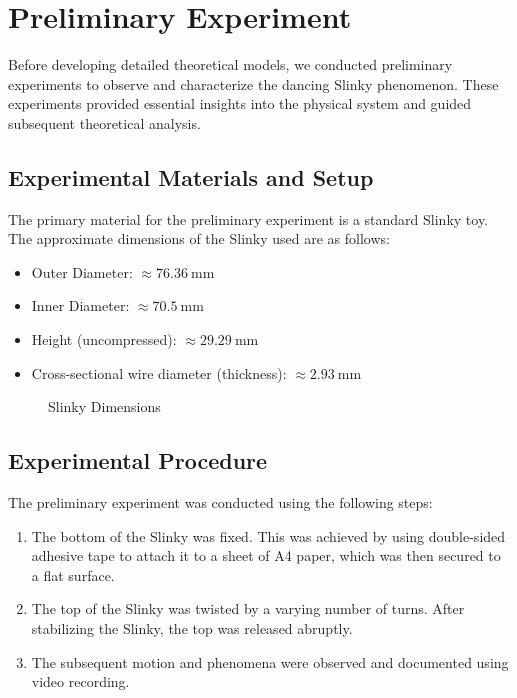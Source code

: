 \documentclass{mcmthesis}  %
\begin{document}
\section{Preliminary Experiment} %

Before developing detailed theoretical models, we conducted preliminary experiments to observe and characterize the dancing Slinky phenomenon. These experiments provided essential insights into the physical system and guided subsequent theoretical analysis.

\subsection{Experimental Materials and Setup} %
The primary material for the preliminary experiment is a standard Slinky toy. The approximate dimensions of the Slinky used are as follows:
\begin{itemize}
    \item Outer Diameter: \(\approx \SI{76.36}{\milli\meter}\)
    \item Inner Diameter: \(\approx \SI{70.5}{\milli\meter}\)
    \item Height (uncompressed): \(\approx \SI{29.29}{\milli\meter}\)
    \item Cross-sectional wire diameter (thickness): \(\approx \SI{2.93}{\milli\meter}\)
\end{itemize}

\begin{figure}[h!]
    \centering
    \caption{Slinky Dimensions}
    \label{fig:slinky_dimensions}
\end{figure}

\subsection{Experimental Procedure} %
The preliminary experiment was conducted using the following steps:
\begin{enumerate}
    \item The bottom of the Slinky was fixed. This was achieved by using double-sided adhesive tape to attach it to a sheet of A4 paper, which was then secured to a flat surface.
    \item The top of the Slinky was twisted by a varying number of turns. After stabilizing the Slinky, the top was released abruptly.
    \item The subsequent motion and phenomena were observed and documented using video recording.
\end{enumerate}
\end{document}
